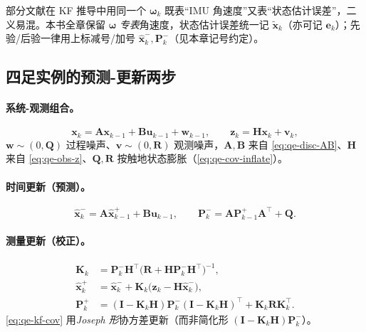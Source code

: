 \begin{note}\label{note:qe-ocr-symbol}
部分文献在 KF 推导中用同一个 $\boldsymbol\omega_k$ 既表“IMU 角速度”又表“状态估计误差”，二义易混。本书全章保留 $\boldsymbol\omega$ \emph{专表}角速度，状态估计误差统一记 $\tilde{\boldsymbol x}_k$（亦可记 $\boldsymbol e_k$）；先验/后验一律用上标减号/加号 $\hat{\boldsymbol x}_k^-,\mathbf{P}_k^-$（见本章记号约定）。
\end{note}

\subsection{四足实例的预测-更新两步}
\label{subsec:qe-kf-steps}

\paragraph{系统-观测组合。}
\begin{equation}
  \boldsymbol x_k = \mathbf{A}\boldsymbol x_{k-1} + \mathbf{B}\boldsymbol u_{k-1} + \boldsymbol w_{k-1},
  \qquad
  \boldsymbol z_k = \mathbf{H}\boldsymbol x_k + \boldsymbol v_k,
  \label{eq:qe-kf-system}
\end{equation}
$\boldsymbol w\sim(0,\mathbf{Q})$ 过程噪声、$\boldsymbol v\sim(0,\mathbf{R})$ 观测噪声，$\mathbf{A},\mathbf{B}$ 来自 \cref{eq:qe-disc-AB}、$\mathbf{H}$ 来自 \cref{eq:qe-obs-z}、$\mathbf{Q},\mathbf{R}$ 按触地状态膨胀（\cref{eq:qe-cov-inflate}）。

\paragraph{时间更新（预测）。}
\begin{equation}
  \hat{\boldsymbol x}_k^- = \mathbf{A}\hat{\boldsymbol x}_{k-1}^+ + \mathbf{B}\boldsymbol u_{k-1},
  \qquad
  \mathbf{P}_k^- = \mathbf{A}\mathbf{P}_{k-1}^+\mathbf{A}^\top + \mathbf{Q}.
  \label{eq:qe-kf-predict}
\end{equation}

\paragraph{测量更新（校正）。}
\begin{align}
  \mathbf{K}_k &= \mathbf{P}_k^-\mathbf{H}^\top\big(\mathbf{R} + \mathbf{H}\mathbf{P}_k^-\mathbf{H}^\top\big)^{-1},
  \label{eq:qe-kf-gain}\\
  \hat{\boldsymbol x}_k^+ &= \hat{\boldsymbol x}_k^- + \mathbf{K}_k\big(\boldsymbol z_k - \mathbf{H}\hat{\boldsymbol x}_k^-\big),
  \label{eq:qe-kf-update}\\
  \mathbf{P}_k^+ &= (\mathbf{I} - \mathbf{K}_k\mathbf{H})\mathbf{P}_k^-(\mathbf{I} - \mathbf{K}_k\mathbf{H})^\top + \mathbf{K}_k\mathbf{R}\mathbf{K}_k^\top.
  \label{eq:qe-kf-cov}
\end{align}
\cref{eq:qe-kf-cov} 用\emph{Joseph 形}协方差更新（而非简化形 $(\mathbf{I}-\mathbf{K}_k\mathbf{H})\mathbf{P}_k^-$）。

